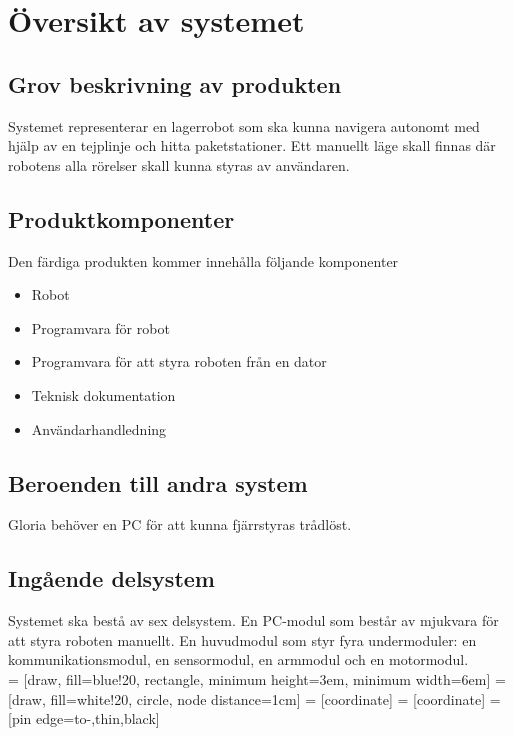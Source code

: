 \section{Översikt av systemet}

\subsection{Grov beskrivning av produkten}
Systemet representerar en lagerrobot som ska kunna navigera autonomt med hjälp av en tejplinje och hitta paketstationer. Ett manuellt läge skall finnas där robotens alla rörelser skall kunna styras av användaren.

\subsection{Produktkomponenter}
Den färdiga produkten kommer innehålla följande komponenter
\begin{itemize}
\item{Robot}
\item{Programvara för robot}
\item{Programvara för att styra roboten från en dator}
\item{Teknisk dokumentation}
\item{Användarhandledning}
\end{itemize}

\subsection{Beroenden till andra system}
Gloria behöver en PC för att kunna fjärrstyras trådlöst.

\subsection{Ingående delsystem}
Systemet ska bestå av sex delsystem. En PC-modul som består av mjukvara för att styra roboten manuellt. En huvudmodul som styr fyra undermoduler: en kommunikationsmodul, en sensormodul, en armmodul och en motormodul. \\

 = [draw, fill=blue!20, rectangle, 
    minimum height=3em, minimum width=6em]
 = [draw, fill=white!20, circle, node distance=1cm]
 = [coordinate]
 = [coordinate]
 = [pin edge={to-,thin,black}]

